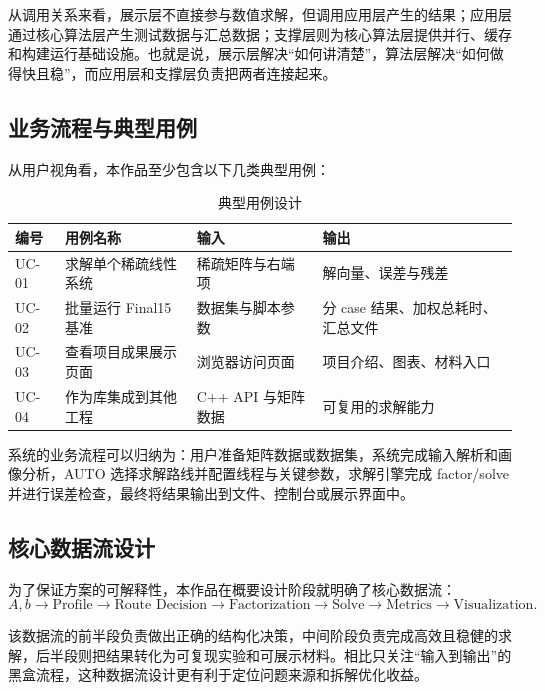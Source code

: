 \documentclass[12pt,a4paper,fontset=none]{ctexart}
\begin{document}
从调用关系来看，展示层不直接参与数值求解，但调用应用层产生的结果；应用层通过核心算法层产生测试数据与汇总数据；支撑层则为核心算法层提供并行、缓存和构建运行基础设施。也就是说，展示层解决“如何讲清楚”，算法层解决“如何做得快且稳”，而应用层和支撑层负责把两者连接起来。

\subsection{业务流程与典型用例}

从用户视角看，本作品至少包含以下几类典型用例：

\begin{table}[H]
\centering
\caption{典型用例设计}
\label{tab:usecase}
\begin{tabular}{p{2cm}p{3.2cm}p{3.2cm}p{4.6cm}}
\toprule
编号 & 用例名称 & 输入 & 输出 \\
\midrule
UC-01 & 求解单个稀疏线性系统 & 稀疏矩阵与右端项 & 解向量、误差与残差 \\
UC-02 & 批量运行 Final15 基准 & 数据集与脚本参数 & 分 case 结果、加权总耗时、汇总文件 \\
UC-03 & 查看项目成果展示页面 & 浏览器访问页面 & 项目介绍、图表、材料入口 \\
UC-04 & 作为库集成到其他工程 & C++ API 与矩阵数据 & 可复用的求解能力 \\
\bottomrule
\end{tabular}
\end{table}

系统的业务流程可以归纳为：用户准备矩阵数据或数据集，系统完成输入解析和画像分析，AUTO 选择求解路线并配置线程与关键参数，求解引擎完成 factor/solve 并进行误差检查，最终将结果输出到文件、控制台或展示界面中。

\subsection{核心数据流设计}

为了保证方案的可解释性，本作品在概要设计阶段就明确了核心数据流：
\begin{equation}
A,b \rightarrow \text{Profile} \rightarrow \text{Route Decision}
\rightarrow \text{Factorization} \rightarrow \text{Solve}
\rightarrow \text{Metrics} \rightarrow \text{Visualization}.
\end{equation}

该数据流的前半段负责做出正确的结构化决策，中间阶段负责完成高效且稳健的求解，后半段则把结果转化为可复现实验和可展示材料。相比只关注“输入到输出”的黑盒流程，这种数据流设计更有利于定位问题来源和拆解优化收益。
\end{document}
